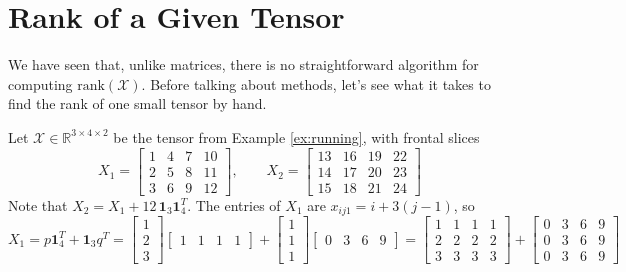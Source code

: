 \section{Rank of a Given Tensor}

  \providecommand{\llbracket}{[\![}
  \providecommand{\rrbracket}{]\!]}
  \providecommand{\brank}{\underline{\mathrm{rank}}}

  We have seen that, unlike matrices, there is no straightforward algorithm for computing $\mathrm{rank}(\mathcal{X})$. Before talking about methods, let's see what it takes to find the rank of one small tensor by hand.

  \begin{example}
    \label{ex:rank-running}
    Let $\mathcal{X} \in \mathbb{R}^{3 \times 4 \times 2}$ be the tensor from Example \ref{ex:running}, with frontal slices
    \begin{equation}
      X_1 = \begin{bmatrix} 1 & 4 & 7 & 10 \\ 2 & 5 & 8 & 11 \\ 3 & 6 & 9 & 12 \end{bmatrix}, \qquad
      X_2 = \begin{bmatrix} 13 & 16 & 19 & 22 \\ 14 & 17 & 20 & 23 \\ 15 & 18 & 21 & 24 \end{bmatrix}
    \end{equation}
    Note that $X_2 = X_1 + 12 \, \mathbf{1}_3 \mathbf{1}_4^T$. The entries of $X_1$ are $x_{ij1} = i + 3(j-1)$, so
    \begin{equation}
      X_1 = p \mathbf{1}_4^T + \mathbf{1}_3 q^T = \begin{bmatrix} 1 \\ 2 \\ 3 \end{bmatrix} \begin{bmatrix} 1 & 1 & 1 & 1 \end{bmatrix} + \begin{bmatrix} 1 \\ 1 \\ 1 \end{bmatrix} \begin{bmatrix} 0 & 3 & 6 & 9 \end{bmatrix} = \begin{bmatrix} 1 & 1 & 1 & 1 \\ 2 & 2 & 2 & 2 \\ 3 & 3 & 3 & 3 \end{bmatrix} + \begin{bmatrix} 0 & 3 & 6 & 9 \\ 0 & 3 & 6 & 9 \\ 0 & 3 & 6 & 9 \end{bmatrix}

\end{equation}
\end{example}
